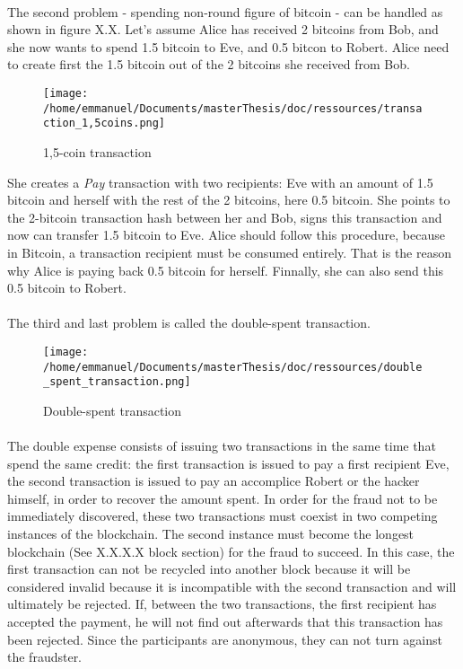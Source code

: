 \paragraph{}
The second problem - spending non-round figure of bitcoin - can be handled as shown in figure X.X. Let's assume Alice has received 2 bitcoins from Bob, and she now wants to spend 1.5 bitcoin to Eve, and 0.5 bitcon to
Robert.
\newline
Alice need to create first the 1.5 bitcoin out of the 2 bitcoins she received from Bob. 
\begin{figure}[htp]
\centering
\texttt{[image: /home/emmanuel/Documents/masterThesis/doc/ressources/transaction\_1,5coins.png]}
\caption{1,5-coin transaction}
\label{}
\end{figure}
She creates a \emph{Pay} transaction with two recipients: Eve with an amount of 1.5 bitcoin and herself with the rest of the 2 bitcoins, here 0.5 bitcoin. She points to the 2-bitcoin transaction hash between her and Bob, signs this transaction and now can transfer 1.5 bitcoin to Eve. Alice should follow this procedure, because in Bitcoin, a transaction recipient must be consumed entirely. That is the reason why Alice is paying back 0.5 bitcoin for herself. Finnally, she can also send this 0.5 bitcoin to Robert.
\paragraph{}
The third and last problem is called the double-spent transaction.
\begin{figure}[htp]
\centering
\texttt{[image: /home/emmanuel/Documents/masterThesis/doc/ressources/double\_spent\_transaction.png]}
\caption{Double-spent transaction}
\label{}
\end{figure}
\paragraph{}
The double expense consists of issuing two transactions in the same time that spend the same credit: the first transaction is issued to pay a first recipient Eve, the second transaction is issued to pay an accomplice Robert or the hacker himself, in order to recover the amount spent. In order for the fraud not to be immediately discovered, these two transactions must coexist in two competing instances of the blockchain. The second instance must become the longest blockchain (See X.X.X.X block section) for the fraud to succeed. In this case, the first transaction can not be recycled into another block because it will be considered invalid because it is incompatible with the second transaction and will ultimately be rejected. If, between the two transactions, the first recipient has accepted the payment, he will not find out afterwards that this transaction has been rejected. Since the participants are anonymous, they can not turn against the fraudster.

